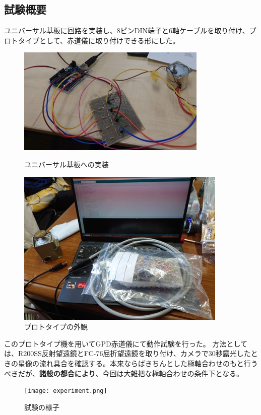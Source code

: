\documentclass[../../main]{subfiles}
\begin{document}
\subsection{試験概要}
ユニバーサル基板に回路を実装し、8ピンDIN端子と6軸ケーブルを取り付け、プロトタイプとして、赤道儀に取り付けできる形にした。
\begin{figure}[H]
  \centering
  \begin{minipage}{0.4\columnwidth}
    \centering
    \includegraphics[width=\columnwidth]{prototype1.jpg}
    \caption{ユニバーサル基板への実装}
    \label{fig:prototype1}
  \end{minipage}
  \begin{minipage}{0.4\columnwidth}
    \centering
    \includegraphics[width=\columnwidth]{prototype2.jpg}
    \caption{プロトタイプの外観}
    \label{fig:prototype2}
  \end{minipage}
\end{figure}
このプロトタイプ機を用いてGPD赤道儀にて動作試験を行った。
方法としては、R200SS反射望遠鏡とFC-76屈折望遠鏡を取り付け、カメラで30秒露光したときの星像の流れ具合を確認する。本来ならばきちんとした極軸合わせのもと行うべきだが、{\bfseries 諸般の都合により}、今回は大雑把な極軸合わせの条件下となる。
\begin{figure}
  \centering
  \texttt{[image: experiment.png]}
  \caption{試験の様子}
  \label{fig:experiment}
\end{figure}
\end{document}
